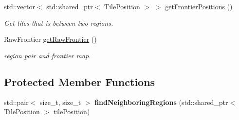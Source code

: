 \begin{DoxyCompactItemize}
std\+::vector$<$ std\+::shared\+\_\+ptr$<$ Tile\+Position $>$ $>$ \hyperlink{classOverseer_1_1Map_a25596fe2da226652be51c7f80b28e28d}{get\+Frontier\+Positions} ()
\begin{DoxyCompactList}\small\item\em Get tiles that is between two regions. \end{DoxyCompactList}\item 
Raw\+Frontier \hyperlink{classOverseer_1_1Map_a7123e4389358218ad74ebce58680b6d2}{get\+Raw\+Frontier} ()
\begin{DoxyCompactList}\small\item\em region pair and frontier map. \end{DoxyCompactList}\end{DoxyCompactItemize}
\subsection*{Protected Member Functions}
\begin{DoxyCompactItemize}
\item 
std\+::pair$<$ size\+\_\+t, size\+\_\+t $>$ {\bfseries find\+Neighboring\+Regions} (std\+::shared\+\_\+ptr$<$ Tile\+Position $>$ tile\+Position)\hypertarget{classOverseer_1_1Map_aa27d53a051f421b9ea93e217b0313359}{}\label{classOverseer_1_1Map_aa27d53a051f421b9ea93e217b0313359}

\end{DoxyCompactItemize}
